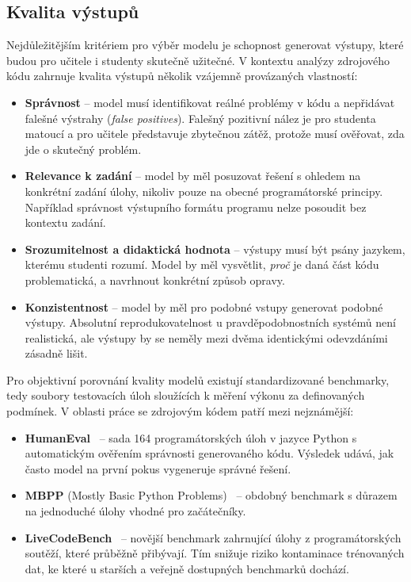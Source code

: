 \subsection{Kvalita výstupů}
\label{subsec:criteria-quality}

Nejdůležitějším kritériem pro výběr modelu je schopnost generovat výstupy, které budou pro učitele i studenty skutečně užitečné.
V kontextu analýzy zdrojového kódu zahrnuje kvalita výstupů několik vzájemně provázaných vlastností:

\begin{itemize}
    \item \textbf{Správnost} -- model musí identifikovat reálné problémy v kódu a nepřidávat falešné výstrahy (\textit{false positives}).
    Falešný pozitivní nález je pro studenta matoucí a pro učitele představuje zbytečnou zátěž, protože musí ověřovat, zda jde o skutečný problém.

    \item \textbf{Relevance k zadání} -- model by měl posuzovat řešení s ohledem na konkrétní zadání úlohy, nikoliv pouze na obecné programátorské principy.
    Například správnost výstupního formátu programu nelze posoudit bez kontextu zadání.

    \item \textbf{Srozumitelnost a didaktická hodnota} -- výstupy musí být psány jazykem, kterému studenti rozumí.
    Model by měl vysvětlit, \textit{proč} je daná část kódu problematická, a navrhnout konkrétní způsob opravy.

    \item \textbf{Konzistentnost} -- model by měl pro podobné vstupy generovat podobné výstupy.
    Absolutní reprodukovatelnost u pravděpodobnostních systémů není realistická, ale výstupy by se neměly mezi dvěma identickými odevzdáními zásadně lišit.
\end{itemize}

Pro objektivní porovnání kvality modelů existují standardizované benchmarky, tedy soubory testovacích úloh sloužících k měření výkonu za definovaných podmínek.
V oblasti práce se zdrojovým kódem patří mezi nejznámější:

\begin{itemize}
    \item \textbf{HumanEval}~\cite{humaneval} -- sada 164 programátorských úloh v jazyce Python s automatickým ověřením správnosti generovaného kódu.
    Výsledek udává, jak často model na první pokus vygeneruje správné řešení.

    \item \textbf{MBPP} (Mostly Basic Python Problems)~\cite{mbpp} -- obdobný benchmark s důrazem na jednoduché úlohy vhodné pro začátečníky.

    \item \textbf{LiveCodeBench}~\cite{livecodebench} -- novější benchmark zahrnující úlohy z programátorských soutěží, které průběžně přibývají.
    Tím snižuje riziko kontaminace trénovaných dat, ke které u starších a veřejně dostupných benchmarků dochází.
\end{itemize}

